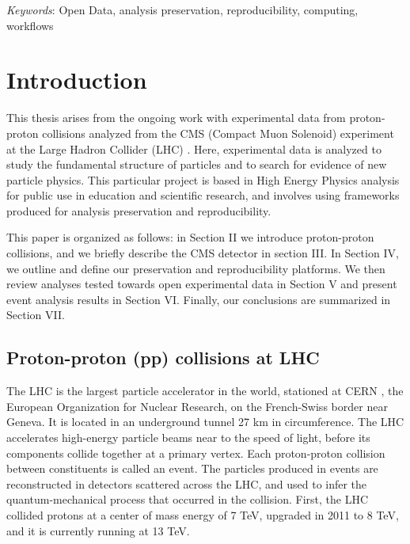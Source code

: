 \documentclass[letter]{article}
\newcommand\tab[1][1cm]{\hspace*{#1}}
\begin{document}
\textit{Keywords}: Open Data, analysis preservation, reproducibility, computing, workflows
\thispagestyle{empty}

\newpage

\tableofcontents

\newpage
\section{Introduction}
\tab This thesis arises from the ongoing work with experimental data from proton-proton collisions analyzed from the CMS (Compact Muon Solenoid) \cite{cms} experiment at the Large Hadron Collider (LHC) \cite{lhc}. Here, experimental data is analyzed to study the fundamental structure of particles and to search for evidence of new particle physics. This particular project is based in High Energy Physics analysis for public use in education and scientific research, and involves using frameworks produced for analysis preservation and reproducibility. 

\tab This paper is organized as follows: in Section II we introduce proton-proton collisions, and we briefly describe the CMS detector in section III. In Section IV, we outline and define our preservation and reproducibility platforms. We then review analyses tested towards open experimental data in Section V and present event analysis results in Section VI. Finally, our conclusions are summarized in Section VII.

\subsection{Proton-proton (pp) collisions at LHC}
\tab The LHC is the largest particle accelerator in the world, stationed at CERN \cite{cern}, the European Organization for Nuclear Research, on the French-Swiss border near Geneva. It is located in an underground tunnel 27 km in circumference. The LHC accelerates high-energy particle beams near to the speed of light, before its components collide together at a primary vertex. Each proton-proton collision between constituents is called an event. The particles produced in events are reconstructed in detectors scattered across the LHC, and used to infer the quantum-mechanical process that occurred in the collision. First, the LHC collided protons at a center of mass energy of 7 TeV, upgraded in 2011 to 8 TeV, and it is currently running at 13 TeV.
\end{document}
